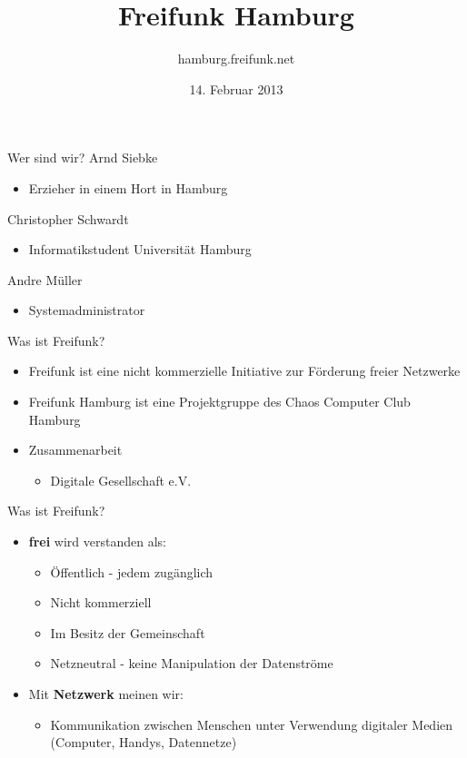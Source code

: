 \documentclass[c]{beamer}
\title{Freifunk Hamburg}
\author{hamburg.freifunk.net}
\date{14. Februar 2013}
\begin{document}
\maketitle

\begin{frame}{Wer sind wir?}
	Arnd Siebke
	\begin{itemize}
		\item Erzieher in einem Hort in Hamburg
	\end{itemize}

	Christopher Schwardt
	\begin{itemize}
		\item Informatikstudent Universität Hamburg
	\end{itemize}

	Andre Müller
	\begin{itemize}
		\item Systemadministrator
	\end{itemize}
\end{frame}

\begin{frame}{Was ist Freifunk?}
	\begin{itemize}
		\item Freifunk ist eine nicht kommerzielle Initiative zur Förderung freier Netzwerke

		\item Freifunk Hamburg ist eine Projektgruppe des Chaos Computer Club Hamburg

		\item Zusammenarbeit
		\begin{itemize}
			\item Digitale Gesellschaft e.V.
		\end{itemize}
	\end{itemize}
\end{frame}

\begin{frame}{Was ist Freifunk?}
\begin{itemize}
	\item \textbf{frei} wird verstanden als:
	\begin{itemize}
		\item Öffentlich - jedem zugänglich
		\item Nicht kommerziell
		\item Im Besitz der Gemeinschaft
		\item Netzneutral - keine Manipulation der Datenströme
	\end{itemize}
	\item Mit \textbf{Netzwerk} meinen wir:
	\begin{itemize}
		\item Kommunikation zwischen Menschen unter Verwendung digitaler Medien (Computer, Handys, Datennetze)
	\end{itemize}
  \end{itemize}
\end{frame}
\end{document}
